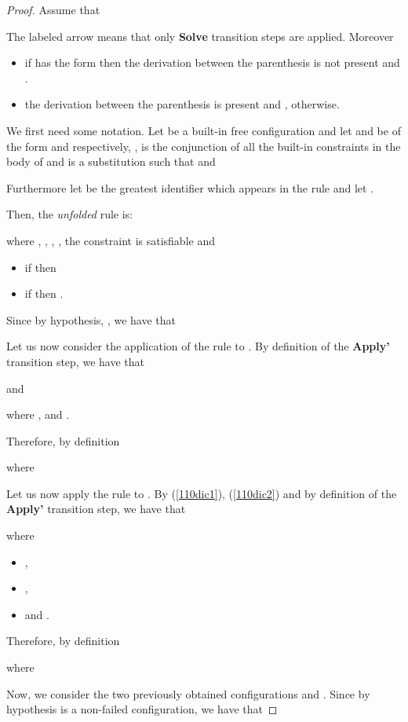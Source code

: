 \documentclass{tlp}
\begin{document}
\begin{proof}
Assume that


The labeled arrow  means that only {\bf Solve} transition steps are applied.
Moreover
\begin{itemize}
           \item if  has the form
 then the derivation between the parenthesis is not present and .
           \item the derivation between the parenthesis is present and , otherwise.
         \end{itemize}

We first need some notation.  Let   be a built-in free configuration
and let  and  be of the form
 and
 respectively,
,  is the conjunction of all the built-in constraints in the body
of  and  is a substitution such that  and

Furthermore let  be the greatest identifier which appears in the
rule  and let .

Then, the \emph{unfolded} rule  is:

where ,
,
, , the
constraint  is satisfiable and
\begin{itemize}
    \item if  then 
    \item if  then .
    \end{itemize}

Since by hypothesis, , we have that


Let us now consider the application of the rule
 to . By definition of the \textbf{Apply'} transition step, we have that

and

where ,
 and
.

Therefore, by definition

  where

Let us now apply the rule  to
. By (\ref{110dic1}), (\ref{110dic2}) and
by definition of the  \textbf{Apply'} transition step, we have that

where
\begin{itemize}
  \item ,
  \item ,
  \item  and
.
\end{itemize}

Therefore, by definition

where


Now, we consider the two previously obtained configurations  and
. Since by hypothesis  is a non-failed configuration, we have that 



\end{proof}
\end{document}
